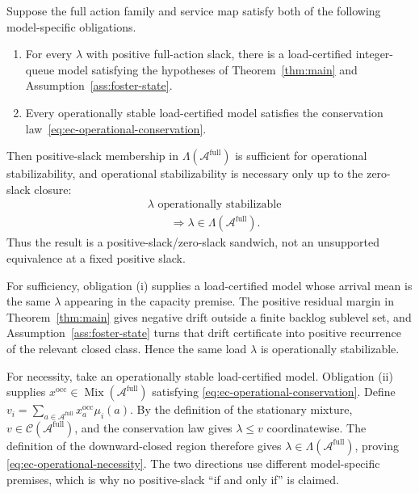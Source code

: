 \documentclass[opre,dblanonrev]{informs4}
\newcommand{\Afull}{\mathcal A^{\mathrm{full}}}
\begin{document}
\begin{proposition}
\label{prop:ec-operational-sandwich}
Suppose the full action family and service map satisfy both of the following
model-specific obligations.
\begin{enumerate}[label=(\roman*)]
\item For every \(\lambda\) with positive full-action slack, there is a
load-certified integer-queue model satisfying the hypotheses of
Theorem~\ref{thm:main} and Assumption~\ref{ass:foster-state}.
\item Every operationally stable load-certified model satisfies the
conservation law~\eqref{eq:ec-operational-conservation}.
\end{enumerate}
Then positive-slack membership in \(\Lambda(\Afull)\) is sufficient for
operational stabilizability, and operational stabilizability is necessary only
up to the zero-slack closure:
\begin{equation}
  \begin{aligned}
  &\lambda\text{ operationally stabilizable}\\
  &\qquad\Longrightarrow
  \lambda\in\Lambda(\Afull).
  \end{aligned}
  \label{eq:ec-operational-necessity}
\end{equation}
Thus the result is a positive-slack/zero-slack sandwich, not an unsupported
equivalence at a fixed positive slack.
\end{proposition}

For sufficiency, obligation (i) supplies a load-certified model whose arrival
mean is the same \(\lambda\) appearing in the capacity premise.  The positive
residual margin in Theorem~\ref{thm:main} gives negative drift outside a finite
backlog sublevel set, and Assumption~\ref{ass:foster-state} turns that drift
certificate into positive recurrence of the relevant closed class.  Hence the
same load \(\lambda\) is operationally stabilizable.

For necessity, take an operationally stable load-certified model.  Obligation
(ii) supplies \(x^{\mathrm{occ}}\in\operatorname{Mix}(\Afull)\) satisfying
\eqref{eq:ec-operational-conservation}.  Define
\(v_i=\sum_{a\in\Afull}x^{\mathrm{occ}}_a\mu_i(a)\).  By the definition of
the stationary mixture, \(v\in\mathcal C(\Afull)\), and the conservation law
gives \(\lambda\le v\) coordinatewise.  The definition of the downward-closed
region therefore gives \(\lambda\in\Lambda(\Afull)\), proving
\eqref{eq:ec-operational-necessity}.  The two directions use different
model-specific premises, which is why no positive-slack ``if and only if'' is
claimed.
\endproof
\end{document}
